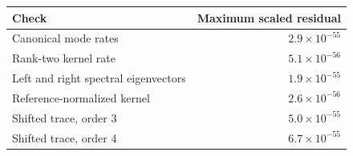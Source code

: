 \begin{center}
\begin{tabular}{lr}
\hline
Check & Maximum scaled residual\\
\hline
Canonical mode rates & $2.9\times10^{-55}$\\
Rank-two kernel rate & $5.1\times10^{-56}$\\
Left and right spectral eigenvectors & $1.9\times10^{-55}$\\
Reference-normalized kernel & $2.6\times10^{-56}$\\
Shifted trace, order 3 & $5.0\times10^{-55}$\\
Shifted trace, order 4 & $6.7\times10^{-55}$\\
\hline
\end{tabular}
\end{center}
